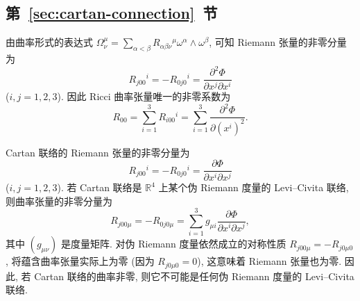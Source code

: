 \subsection{\texorpdfstring{第~\ref{sec:cartan-connection}~节}{Cartan 联络}}\label{subsec:solutions-cartan-connection}

\begin{description}[font=\normalfont,leftmargin=2em,labelwidth=1.5em]
由曲率形式的表达式 $\Omega_\nu^\mu=\sum_{\alpha<\beta}R_{\alpha\beta\nu}{}^\mu\omega^\alpha\wedge\omega^\beta$, 可知 Riemann 张量的非零分量为
\[
  R_{j00}{}^i=-R_{0j0}{}^i=\frac{\partial^2\Phi}{\partial x^j\partial x^i}
\]
($i,j=1,2,3$). 因此 Ricci 曲率张量唯一的非零系数为
\[
  R_{00}=\sum_{i=1}^3 R_{i00}{}^i=\sum_{i=1}^3\frac{\partial^2\Phi}{\partial(x^i)^2}.
\]

Cartan 联络的 Riemann 张量的非零分量为
\[
  R_{j00}{}^i=-R_{0j0}{}^i=\frac{\partial\Phi}{\partial x^i\partial x^j}
\]
($i,j=1,2,3$). 若 Cartan 联络是 $\mathbb{R}^4$ 上某个伪 Riemann 度量的 Levi–Civita 联络, 则曲率张量的非零分量为
\[
  R_{j00\mu}=-R_{0j0\mu}
   =\sum_{i=1}^3g_{\mu i}\frac{\partial\Phi}{\partial x^i\partial x^j},
\]
其中 $(g_{\mu\nu})$ 是度量矩阵. 对伪 Riemann 度量依然成立的对称性质 $R_{j00\mu}=-R_{j0\mu0}$, 将蕴含曲率张量实际上为零 (因为 $R_{j0\mu0}=0$), 这意味着 Riemann 张量也为零. 因此, 若 Cartan 联络的曲率非零, 则它不可能是任何伪 Riemann 度量的 Levi–Civita 联络.
\end{description}
